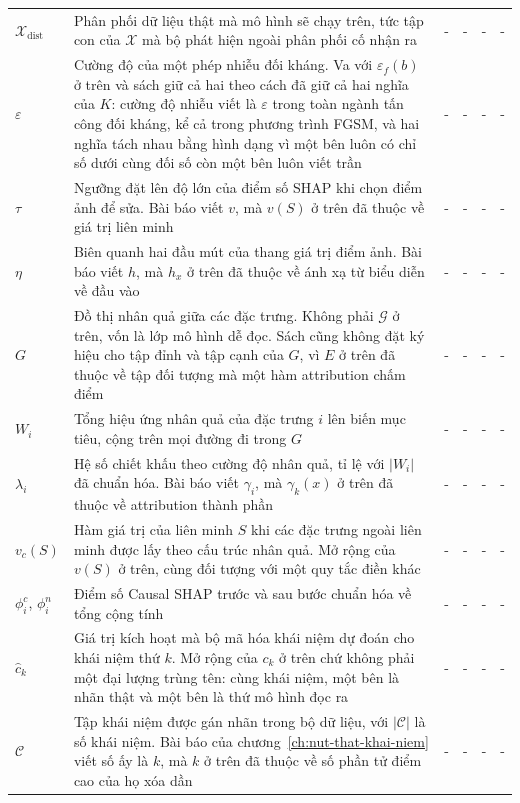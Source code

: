 \begin{longtable}{@{}lp{\kyhieuw}p{\kyhieuwmap}p{\kyhieuwmap}p{\kyhieuwmap}p{\kyhieuwlast}@{}}
$\mathcal{X}_{\mathrm{dist}}$ & Phân phối dữ liệu thật mà mô hình sẽ chạy trên, tức tập con của $\mathcal{X}$ mà bộ phát hiện ngoài phân phối cố nhận ra & - & - & - & - \\
$\varepsilon$ & Cường độ của một phép nhiễu đối kháng. Va với $\varepsilon_f(b)$ ở trên và sách giữ cả hai theo cách đã giữ cả hai nghĩa của $K$: cường độ nhiễu viết là $\varepsilon$ trong toàn ngành tấn công đối kháng, kể cả trong phương trình FGSM, và hai nghĩa tách nhau bằng hình dạng vì một bên luôn có chỉ số dưới cùng đối số còn một bên luôn viết trần & - & - & - & - \\
$\tau$ & Ngưỡng đặt lên độ lớn của điểm số SHAP khi chọn điểm ảnh để sửa. Bài báo viết $v$, mà $v(S)$ ở trên đã thuộc về giá trị liên minh & - & - & - & - \\
$\eta$ & Biên quanh hai đầu mút của thang giá trị điểm ảnh. Bài báo viết $h$, mà $h_x$ ở trên đã thuộc về ánh xạ từ biểu diễn về đầu vào & - & - & - & - \\
$G$ & Đồ thị nhân quả giữa các đặc trưng. Không phải $\mathcal{G}$ ở trên, vốn là lớp mô hình dễ đọc. Sách cũng không đặt ký hiệu cho tập đỉnh và tập cạnh của $G$, vì $E$ ở trên đã thuộc về tập đối tượng mà một hàm attribution chấm điểm & - & - & - & - \\
$W_i$ & Tổng hiệu ứng nhân quả của đặc trưng $i$ lên biến mục tiêu, cộng trên mọi đường đi trong $G$ & - & - & - & - \\
$\lambda_i$ & Hệ số chiết khấu theo cường độ nhân quả, tỉ lệ với $\lvert W_i\rvert$ đã chuẩn hóa. Bài báo viết $\gamma_i$, mà $\gamma_k(x)$ ở trên đã thuộc về attribution thành phần & - & - & - & - \\
$v_c(S)$ & Hàm giá trị của liên minh $S$ khi các đặc trưng ngoài liên minh được lấy theo cấu trúc nhân quả. Mở rộng của $v(S)$ ở trên, cùng đối tượng với một quy tắc điền khác & - & - & - & - \\
$\phi^c_i$, $\phi^n_i$ & Điểm số Causal SHAP trước và sau bước chuẩn hóa về tổng cộng tính & - & - & - & - \\
$\hat c_k$ & Giá trị kích hoạt mà bộ mã hóa khái niệm dự đoán cho khái niệm thứ $k$. Mở rộng của $c_k$ ở trên chứ không phải một đại lượng trùng tên: cùng khái niệm, một bên là nhãn thật và một bên là thứ mô hình đọc ra & - & - & - & - \\
$\mathcal{C}$ & Tập khái niệm được gán nhãn trong bộ dữ liệu, với $\lvert\mathcal{C}\rvert$ là số khái niệm. Bài báo của chương~\ref{ch:nut-that-khai-niem} viết số ấy là $k$, mà $k$ ở trên đã thuộc về số phần tử điểm cao của họ xóa dần & - & - & - & - \\

\end{longtable}
